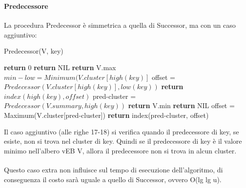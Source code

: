 \documentclass{article}
\begin{document}
            \textbf{Predecessore}\\\\
            La procedura Predecessor è simmetrica a quella di Successor, ma con un caso aggiuntivo:
            \begin{algorithm}
                \caption{Predecessor(V, key)}
                \begin{algorithmic}
                    
                            \STATE \textbf{return} 0
                        \ELSE 
                            \STATE \textbf{return} NIL
                        \ENDIF
                        \STATE \textbf{return} V.max
                    \ELSE
                        \STATE $min-low = Minimum(V.cluster[high(key)]$
                            \STATE offset = $Predecessor(V.cluster[high(key)], low(key))$
                            \STATE \textbf{return} $index(high(key), offset)$
                        \ELSE
                            \STATE pred-cluster = $Predecessor(V.summary, high(key))$
                                    \STATE \textbf{return} V.min
                                \ELSE \textbf{return} NIL
                                \ENDIF
                            \ELSE 
                                \STATE offset = Maximum(V.cluster[pred-cluster])
                                \STATE \textbf{return} index(pred-cluster, offset)
                            \ENDIF
                        \ENDIF
                        
                    \ENDIF %
                \end{algorithmic}
            \end{algorithm}
            
            Il caso aggiuntivo (alle righe 17-18) si verifica quando il predecessore di key, se esiste, non si trova nel cluster di key. Quindi se il predecessore di key è il valore minimo nell'albero vEB V, allora il predecessore non si trova in alcun cluster.\\\\
            Questo caso extra non influisce sul tempo di esecuzione dell'algoritmo, di conseguenza il costo sarà uguale a quello di Successor, ovvero O(lg lg u).\\
            
\end{document}
